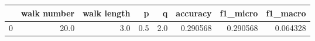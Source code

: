 \begin{tabular}{lrrrrrrr}
\toprule
{} &  walk number &  walk length &    p &    q &  accuracy &  f1\_micro &  f1\_macro \\
\midrule
0 &         20.0 &          3.0 &  0.5 &  2.0 &  0.290568 &  0.290568 &  0.064328 \\
\bottomrule
\end{tabular}
